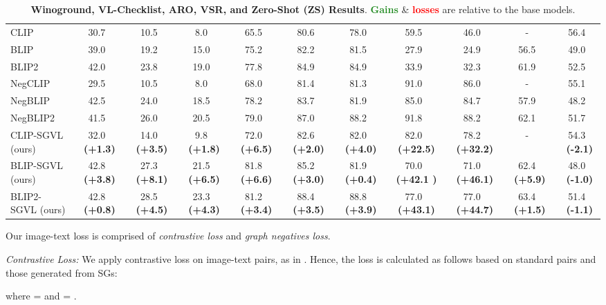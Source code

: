 \documentclass[11pt]{article}
\newcommand{\minisection}[1]{\noindent{\textbf{#1}.}}
\newcommand{\gcol}[1]{{\bf \fontsize{6.5}{42}\selectfont \color{citecolor!80}~(#1)}}
\newcommand{\rcol}[1]{{\bf \fontsize{6.5}{42}\selectfont \color{lightred!180}~(#1)}}
\newcommand\green[1]{\textcolor{forestgreen}{\textbf{#1}}}
\newcommand\red[1]{\textcolor{red}{\textbf{#1}}}
\begin{document}
\begin{table*}[t!]
\begin{small}
\begin{tabular}{l|ccc|ccc|cc|c|c}
            \midrule 
CLIP  & 30.7 &10.5 & 8.0  & 65.5 & 80.6 & 78.0 & 59.5 & 46.0 & - & 56.4\\
BLIP  &39.0 &19.2 & 15.0 & 75.2 & 82.2 & 81.5 & 27.9 & 24.9 & 56.5 &  49.0\\
            BLIP2 &42.0 &23.8 &19.0  &77.8  &84.9  &84.9  &33.9 &32.3 & 61.9 & 52.5 \\
\midrule 
            NegCLIP & 29.5 & 10.5 & 8.0  &68.0  &81.4  & 81.3 & 91.0  & 86.0  & - & 55.1 \\
            NegBLIP  &42.5 &24.0 &18.5  &78.2  &83.7  &81.9  & 85.0  & 84.7  & 57.9 & 48.2 \\
            NegBLIP2 & 41.5 & 26.0 & 20.5  & 79.0  &87.0  &88.2  &91.8   & 88.2 & 62.1  &51.7  \\
            \midrule
            CLIP-SGVL (ours) &32.0 \gcol{+1.3} &14.0 \gcol{+3.5} & 9.8 \gcol{+1.8}  & 72.0 \gcol{+6.5} & 82.6 \gcol{+2.0} & 82.0 \gcol{+4.0} & 82.0 \gcol{+22.5} & 78.2 \gcol{+32.2} & - &  54.3 \rcol{-2.1}\\
            BLIP-SGVL (ours) &42.8 \gcol{+3.8} &27.3 \gcol{+8.1} & 21.5 \gcol{+6.5} & 81.8 \gcol{+6.6} & 85.2 \gcol{+3.0} & 81.9 \gcol{+0.4} & 70.0 \gcol{+42.1 } & 71.0 \gcol{+46.1} & 62.4 \gcol{+5.9} &  48.0 \rcol{-1.0}\\
            BLIP2-SGVL (ours) &42.8 \gcol{+0.8} &28.5 \gcol{+4.5} &23.3 \gcol{+4.3}  & 81.2 \gcol{+3.4}  &88.4 \gcol{+3.5}  &88.8 \gcol{+3.9}  &77.0 \gcol{+43.1}  &77.0 \gcol{+44.7}  & 63.4 \gcol{+1.5} &51.4 \rcol{-1.1}  \\
            \bottomrule        
    \end{tabular}
    \end{small}
    \vspace{-1.0em}
    \caption{
    \textbf{Winoground, VL-Checklist, ARO, VSR, and Zero-Shot (ZS) Results}. \green{Gains} \& \red{losses} are relative to the base models.}
    \vspace{-1.5em}
    \label{tab:res_main}
\end{table*} 
\minisection{Image-Text Loss}
Our image-text loss is comprised of \textit{contrastive loss} and \textit{graph negatives loss}. 

\noindent \textit{Contrastive Loss:} We apply contrastive loss on image-text pairs, as in \citet{radford2021learning}. Hence, the loss is calculated as follows based on standard pairs and those generated from SGs:
 
where  =  and  = .
\end{document}
